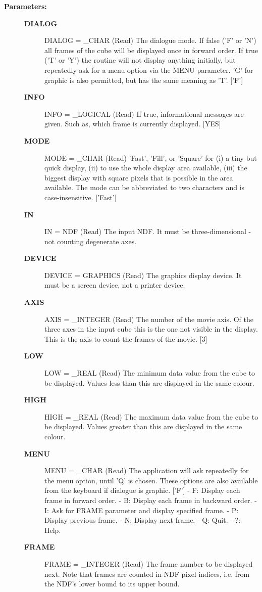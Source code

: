 \begin{description}
\begin{description}
\item [\textbf{Parameters:}]
\begin{description}
\item [\textbf{DIALOG}]
DIALOG = \_CHAR (Read)
   The dialogue mode. If false ('F' or 'N') all frames of the cube
   will be displayed once in forward order. If true ('T' or 'Y')
   the routine will not display anything initially, but repeatedly
   ask for a menu option via the MENU parameter. 'G' for graphic
   is also permitted, but has the same meaning as 'T'. ['F']
\item [\textbf{INFO}]
INFO = \_LOGICAL (Read)
   If true, informational messages are given. Such as, which frame
   is currently displayed. [YES]
\item [\textbf{MODE}]
MODE = \_CHAR (Read)
   'Fast', 'Fill', or 'Square' for (i) a tiny but quick display,
   (ii) to use the whole display area available, (iii) the biggest
   display with square pixels that is possible in the area
   available. The mode can be abbreviated to two characters and is
   case-insensitive. ['Fast']
\item [\textbf{IN}]
IN = NDF (Read)
   The input NDF. It must be three-dimensional - not counting
   degenerate axes.
\item [\textbf{DEVICE}]
DEVICE = GRAPHICS (Read)
   The graphics display device. It must be a screen device, not a
   printer device.
\item [\textbf{AXIS}]
AXIS = \_INTEGER (Read)
   The number of the movie axis. Of the three axes in the input
   cube this is the one not visible in the display. This is the
   axis to count the frames of the movie. [3]
\item [\textbf{LOW}]
LOW = \_REAL (Read)
   The minimum data value from the cube to be displayed. Values
   less than this are displayed in the same colour.
\item [\textbf{HIGH}]
HIGH = \_REAL (Read)
   The maximum data value from the cube to be displayed. Values
   greater than this are displayed in the same colour.
\item [\textbf{MENU}]
MENU = \_CHAR (Read)
   The application will ask repeatedly for the menu option, until
   'Q' is chosen. These options are also available from the
   keyboard if dialogue is graphic. ['F']
   -  F: Display each frame in forward order.
   -  B: Display each frame in backward order.
   -  I: Ask for FRAME parameter and display specified frame.
   -  P: Display previous frame.
   -  N: Display next frame.
   -  Q: Quit.
   -  ?: Help.
\item [\textbf{FRAME}]
FRAME = \_INTEGER (Read)
   The frame number to be displayed next. Note that frames are
   counted in NDF pixel indices, i.e. from the NDF's lower bound
   to its upper bound.


\end{description}
\end{description}
\end{description}
